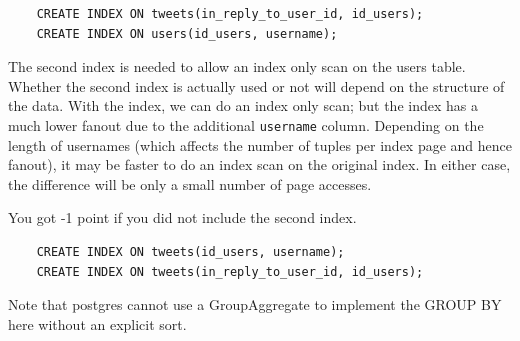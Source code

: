 \documentclass[12pt]{exam}
\theoremstyle{definition}
\begin{document}
\begin{questions}
\newpage
{}
\begin{solution}
    \begin{lstlisting}
    CREATE INDEX ON tweets(in_reply_to_user_id, id_users);
    CREATE INDEX ON users(id_users, username);
    \end{lstlisting}
    The second index is needed to allow an index only scan on the users table.
    Whether the second index is actually used or not will depend on the structure of the data.
    With the index, we can do an index only scan;
    but the index has a much lower fanout due to the additional \lstinline{username} column.
    Depending on the length of usernames (which affects the number of tuples per index page and hence fanout),
    it may be faster to do an index scan on the original index.
    In either case, the difference will be only a small number of page accesses.

    You got -1 point if you did not include the second index.
\end{solution}

\begin{solution}
    \begin{lstlisting}
    CREATE INDEX ON tweets(id_users, username);
    CREATE INDEX ON tweets(in_reply_to_user_id, id_users);
    \end{lstlisting}
    Note that postgres cannot use a GroupAggregate to implement the GROUP BY here without an explicit sort.
\end{solution}
\newpage


\end{questions}
\end{document}
